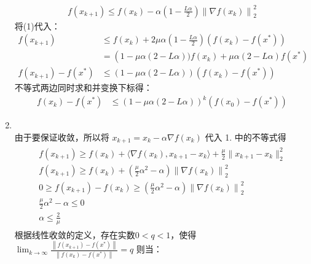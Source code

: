 \documentclass[11pt,letter,notitlepage]{article}
\begin{document}
\begin{solution}
\begin{enumerate}
        \begin{align*}
            f\left(x_{k+1}\right) \leqslant f\left(x_{k}\right)-\alpha\left(1-\frac{L \alpha}{2}\right)\left\|\nabla f\left(x_{k}\right)\right\|_{2}^{2}
        \end{align*}
        将(1)代入：
        \begin{align*}
           f(x_{k+1}) & \leqslant f\left(x_{k}\right)+2 \mu \alpha \left(1-\frac{L \alpha}{2}\right)\left(f\left(x_{k}\right)-f\left(x^{*}\right)\right) \\ &=\left(1-\mu \alpha (2-L \alpha )) f\left(x_{k}\right)+\mu \alpha (2-L \alpha) f\left(x^{*}\right)\right.\\
           f\left(x_{k+1}\right)-f\left(x^{*}\right) & \leqslant\left(1-\mu \alpha(2-L \alpha )\right)\left(f\left(x_{k}\right)-f\left(x^{*}\right)\right)
        \end{align*}
        不等式两边同时求和并变换下标得：
        \begin{align*}
            f\left(x_{k}\right)-f\left(x^{*}\right) & \leqslant(1-\mu \alpha(2-L\alpha ))^{k}\left(f\left(x_{0}\right)-f\left(x^{*}\right)\right)
        \end{align*}
        \item \ \\
        由于要保证收敛，所以将 $x_{k+1} = x_{k} - \alpha \nabla f(x_k)$ 代入 1. 中的不等式得
        \begin{align*}
        \begin{array}{c}{f\left(x_{k+1}\right) \geqslant f\left(x_{k}\right)+\langle \nabla f\left(x_{k}\right), x_{k+1}-x_{k}\rangle+\frac{\mu}{2} \| x_{k+1} -x_k }\|_2^2 \\ {f\left(x_{k+1}\right) \geqslant f\left(x_{k}\right)+\left(\frac{\mu}{2} \alpha^{2}-\alpha\right)\left\|\nabla f\left(x_{k}\right)\right\|_{2}^{2}}\\{0\geqslant f\left(x_{k+1}\right) - f(x_k) \geqslant \left(\frac{\mu}{2} \alpha^{2}-\alpha\right)\left\|\nabla f\left(x_{k}\right)\right\|_{2}^{2}} \\ {\frac{\mu}{2} \alpha^{2}-\alpha \leqslant 0} \\ {\alpha \leqslant \frac{2}{\mu}}\end{array}
        \end{align*}
        根据线性收敛的定义，存在实数$0 < q < 1$，使得$\lim _{k \rightarrow \infty} \frac{\left\|f(x_{k+1})-f(x^{*})\right\|}{\left\|f(x_{k})-f(x^{*})\right\|}=q$ 则当：\\
        \begin{align*} 

\end{align*}
\end{enumerate}
\end{solution}
\end{document}

